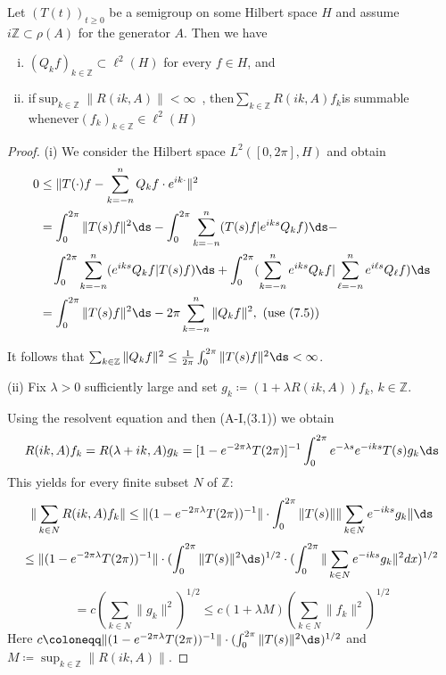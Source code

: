 \begin{lemma}\label{lem:a3-7.9}
Let $(T(t))_{t\geq 0}$ be a semigroup on some Hilbert space $H$ and assume $i\mathbb{Z} \subset \rho(A)$ for the generator $A$.
Then we have


\newpage

\begin{enumerate}[(i)]
\item $(Q_{k}f)_{k\in\mathbb{Z}} \subset \ell^{2}(H)$ for every $f \in H$, and

\item if\quad $\sup_{k\in\mathbb{Z}}\|R(ik,A)\| < \infty$~, then\quad $\sum_{k\in\mathbb{Z}} R(ik,A)f_{k}$\quad is summable whenever\quad $(f_{k})_{k\in\mathbb{Z}} \in \ell^{2}(H)$
\end{enumerate}
\end{lemma}

\begin{proof}
(i) We consider the Hilbert space $L^{2}([0,2\pi],H)$ and obtain
\begin{align*}
0 &\leq \|T(\cdot)f - \sum_{k=-n}^{n} Q_{k}f\cdot e^{ik\cdot}\|^{2} \\
&= \int_{0}^{2\pi} \|T(s)f\|^{2} \ds - \int_{0}^{2\pi} \sum_{k=-n}^{n} (T(s)f|e^{iks}Q_{k}f) \ds - \\
&\quad \int_{0}^{2\pi} \sum_{k=-n}^{n} (e^{iks}Q_{k}f|T(s)f) \ds + \int_{0}^{2\pi} (\sum_{k=-n}^{n} e^{iks}Q_{k}f|\sum_{\ell=-n}^{n} e^{i\ell s}Q_{\ell}f) \ds \\
&= \int_{0}^{2\pi} \|T(s)f\|^{2} \ds - 2\pi\sum_{k=-n}^{n} \|Q_{k}f\|^{2}, \text{ (use (7.5))}
\end{align*}

It follows that $\sum_{k\in\mathbb{Z}} \|Q_{k}f\|^{2} \leq \frac{1}{2\pi}\int_{0}^{2\pi} \|T(s)f\|^{2} \ds < \infty$.

(ii) Fix $\lambda > 0$ sufficiently large and set $g_{k}\coloneqq (1 + \lambda R(ik,A))f_{k}$, $k \in \mathbb{Z}$.

Using the resolvent equation and then (A-I,(3.1)) we obtain
\[
R(ik,A)f_{k} = R(\lambda + ik,A)g_{k} = [1 - e^{-2\pi\lambda}T(2\pi)]^{-1}\int_{0}^{2\pi} e^{-\lambda s}e^{-iks}T(s)g_{k} \ds
\]
This yields for every finite subset $N$ of $\mathbb{Z}$:
\[
\|\sum_{k\in N} R(ik,A)f_{k}\| \leq \|(1 - e^{-2\pi\lambda}T(2\pi))^{-1}\|\cdot\int_{0}^{2\pi} \|T(s)\| \|\sum_{k\in N} e^{-iks}g_{k}\| \ds 
\]
\[
\leq \|(1 - e^{-2\pi\lambda}T(2\pi))^{-1}\|\cdot(\int_{0}^{2\pi}\|T(s)\|^{2} \ds)^{1/2} \cdot (\int_{0}^{2\pi}\|\sum_{k\in N} e^{-iks}g_{k}\|^{2} dx)^{1/2} 
\]
\[
= c(\sum_{k\in N} \|g_{k}\|^{2})^{1/2} \leq c(1 + \lambda M)(\sum_{k\in N} \|f_{k}\|^{2})^{1/2}
\]
Here $c\coloneqq \|(1 - e^{-2\pi\lambda}T(2\pi))^{-1}\|\cdot(\int_{0}^{2\pi}\|T(s)\|^{2} \ds)^{1/2}$ and $M\coloneqq \sup_{k\in\mathbb{Z}}\|R(ik,A)\|$.
\end{proof}


